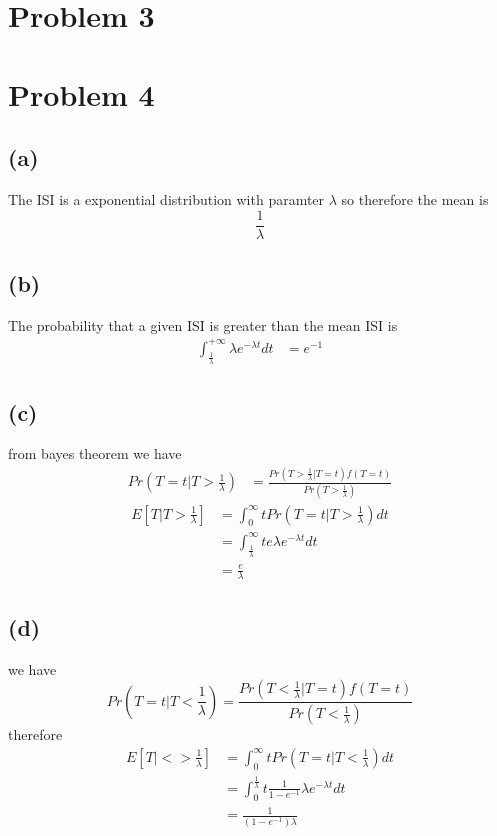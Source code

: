 \documentclass[12pt]{article}
\begin{document}
\section*{Problem 3}

\section*{Problem 4}
\subsection*{(a)}
The ISI is a exponential distribution with paramter $\lambda$ so therefore the mean is
$$\frac{1}{\lambda}$$
\subsection*{(b)}
The probability that a given ISI is greater than the mean ISI is 
\begin{align*}
    \int_{\frac{1}{\lambda}}^{+\infty}\lambda e^{-\lambda t}dt&=\boxed{e^{-1}}
\end{align*}
\subsection*{(c)}
from bayes theorem we have
\begin{align*}
    Pr\left(T=t|T>\frac{1}{\lambda}\right)&=\frac{Pr(T>\frac{1}{\lambda}|T=t)f(T=t)}{Pr(T>\frac{1}{\lambda})} 
\end{align*}
\begin{align*}
    E[T|T>\frac{1}{\lambda}]&=\int_{0}^{\infty}tPr\left(T=t|T>\frac{1}{\lambda}\right)dt\\
    &=\int_{\frac{1}{\lambda}}^{\infty}te \lambda e^{-\lambda t} dt\\
    &=\boxed{\frac{e}{\lambda}}
\end{align*}

\subsection*{(d)}
we have
$$Pr\left(T=t|T<\frac{1}{\lambda}\right)=\frac{Pr(T<\frac{1}{\lambda}|T=t)f(T=t)}{Pr(T<\frac{1}{\lambda})}$$
therefore
\begin{align*}
    E[T|<>\frac{1}{\lambda}]&=\int_{0}^{\infty}tPr\left(T=t|T<\frac{1}{\lambda}\right)dt\\
    &=\int_{0}^{\frac{1}{\lambda}}t\frac{1}{1-e^{-1}} \lambda e^{-\lambda t} dt\\
    &=\boxed{\frac{1}{(1-e^{-1})\lambda}}
\end{align*}
\end{document}
